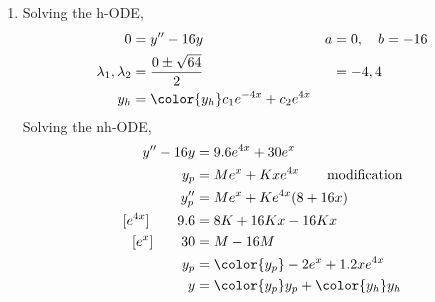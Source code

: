 \begin{enumerate}
    \item Solving the h-ODE,
          \begin{align}
              0                        & = y'' - 16y                              & a & = 0, \quad b = -16 \\
              \lambda_{1}, \lambda_{2} & = \frac{0 \pm \sqrt{64}}{2}              &   & = -4, 4            \\
              y_{h}                    & = \color{y_h} c_{1}e^{-4x} + c_{2}e^{4x}
          \end{align}
          Solving the nh-ODE,
          \begin{align}
              y'' - 16y           & = 9.6e^{4x} + 30e^{x}                                  \\
              y_{p}               & = Me^{x} + Kxe^{4x}         \qquad \text{modification} \\
              y_{p}''             & = Me^{x} + Ke^{4x}(8 + 16x)                            \\
              [e^{4x}] \qquad 9.6 & = 8K + 16Kx - 16Kx                                     \\
              [e^{x}] \qquad 30   & = M - 16M                                              \\
              y_{p}               & = \color{y_p} -2e^{x} + 1.2xe^{4x}                     \\
              y                   & = {\color{y_p} y_{p}} + {\color{y_h} y_{h}}
          \end{align}


\end{enumerate}
